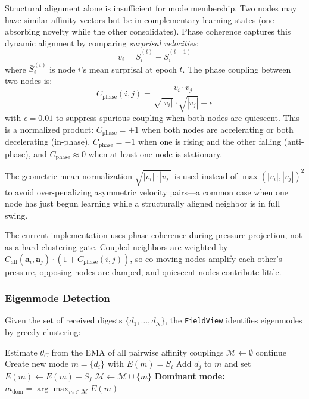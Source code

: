 Structural alignment alone is insufficient for mode membership.  Two
nodes may have similar affinity vectors but be in complementary
learning states (one absorbing novelty while the other consolidates).
Phase coherence captures this dynamic alignment by comparing
\emph{surprisal velocities}:
\begin{equation}
  v_i = \bar{S}_i^{(t)} - \bar{S}_i^{(t-1)}
  \label{eq:phase_velocity}
\end{equation}
where $\bar{S}_i^{(t)}$ is node $i$'s mean surprisal at epoch $t$.
The phase coupling between two nodes is:
\begin{equation}
  C_{\text{phase}}(i, j)
    = \frac{v_i \cdot v_j}{\sqrt{|v_i|} \cdot \sqrt{|v_j|} + \epsilon}
  \label{eq:phase_coupling}
\end{equation}
with $\epsilon = 0.01$ to suppress spurious coupling when both nodes
are quiescent.  This is a normalized product: $C_{\text{phase}} = +1$
when both nodes are accelerating or both decelerating (in-phase),
$C_{\text{phase}} = -1$ when one is rising and the other falling
(anti-phase), and $C_{\text{phase}} \approx 0$ when at least one node
is stationary.

The geometric-mean normalization $\sqrt{|v_i| \cdot |v_j|}$ is used
instead of $\max(|v_i|, |v_j|)^2$ to avoid over-penalizing asymmetric
velocity pairs---a common case when one node has just begun learning
while a structurally aligned neighbor is in full swing.

The current implementation uses phase coherence during pressure
projection, not as a hard clustering gate.  Coupled neighbors are
weighted by $C_{\text{aff}}(\mathbf{a}_i,\mathbf{a}_j) \cdot
(1 + C_{\text{phase}}(i,j))$, so co-moving nodes amplify each other's
pressure, opposing nodes are damped, and quiescent nodes contribute
little.

\subsubsection{Eigenmode Detection}
\label{sec:eigenmode_detection}

Given the set of received digests $\{d_1, \ldots, d_N\}$, the
\texttt{FieldView} identifies eigenmodes by greedy clustering:

\begin{algorithm}[H]
\caption{Eigenmode Detection}
\label{alg:eigenmode}
\begin{algorithmic}[1]
\State Estimate $\theta_C$ from the EMA of all pairwise affinity couplings
\State $\mathcal{M} \leftarrow \emptyset$ 
    \State continue
  \EndIf
  \State Create new mode $m = \{d_i\}$ with $E(m) = \bar{S}_i$
      \State Add $d_j$ to $m$ and set $E(m) \leftarrow E(m) + \bar{S}_j$
    \EndIf
  \EndFor
  \State $\mathcal{M} \leftarrow \mathcal{M} \cup \{m\}$
\EndFor
\State \textbf{Dominant mode:}
       $m_{\text{dom}} = \arg\max_{m \in \mathcal{M}} E(m)$
\end{algorithmic}
\end{algorithm}

